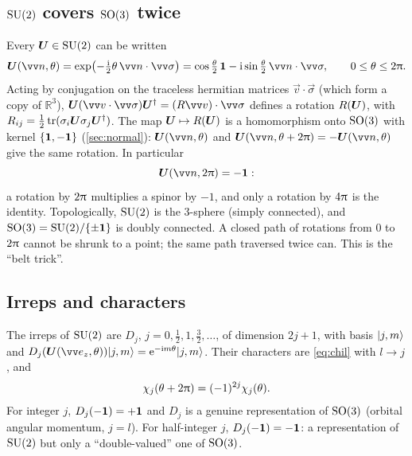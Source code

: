 \subsection{\texorpdfstring{$\mathrm{SU}(2)$}{SU(2)} covers \texorpdfstring{$\mathrm{SO}(3)$}{SO(3)} twice}
Every $\bm{U}\in\mathrm{SU}(2)$ can be written
\begin{equation}
\mat{U}(\vec{n},\theta)=\exp\bigl(-\tfrac{\ii}{2}\theta\,\vec{n}\cdot\vec{\sigma}\bigr)
=\cos\tfrac{\theta}{2}\,\one-\ii\sin\tfrac{\theta}{2}\,\vec{n}\cdot\vec{\sigma},
\qquad 0\le\theta\le2\cpi .
\end{equation}
Acting by conjugation on the traceless hermitian matrices $\vec{v}\cdot\vec{\sigma}$
(which form a copy of $\mathbb{R}^3$), $\mat{U}(\vec{v}\cdot\vec{\sigma})\mat{U}\herm=
(R\vec{v})\cdot\vec{\sigma}$ defines a rotation $R(\bm{U})$, with
$R_{ij}=\tfrac12\operatorname{tr}(\sigma_i\bm{U}\sigma_j\bm{U}^{\dagger})$. The map $\bm{U}\mapsto R(\bm{U})$ is a
homomorphism onto $\mathrm{SO}(3)$ with kernel $\{\bm{1},-\bm{1}\}$ (\cref{sec:normal}):
$\mat{U}(\vec{n},\theta)$ and $\mat{U}(\vec{n},\theta+2\cpi)=-\mat{U}(\vec{n},\theta)$ give
the same rotation. In particular
\begin{equation}
\mat{U}(\vec{n},2\cpi)=-\one:
\end{equation}
a rotation by $2\uppi$ multiplies a spinor by $-1$, and only a rotation by $4\uppi$ is the
identity. Topologically, $\mathrm{SU}(2)$ is the 3-sphere (simply connected), and
$\mathrm{SO}(3)=\mathrm{SU}(2)/\{\pm\bm{1}\}$ is doubly connected. A closed path of rotations from $0$ to
$2\uppi$ cannot be shrunk to a point; the same path traversed twice can. This is the
``belt trick''.

\subsection{Irreps and characters}
The irreps of $\mathrm{SU}(2)$ are $D_j$, $j=0,\tfrac12,1,\tfrac32,\dots$, of dimension $2j+1$,
with basis $\lvert j,m\rangle$ and $D_j(\mat{U}(\vec{e}_z,\theta))\ket{j,m}=\ee^{-\ii m\theta}\ket{j,m}$.
Their characters are \eqref{eq:chil} with $l\to j$, and
\begin{equation}
\chi_j(\theta+2\uppi)=(-1)^{2j}\chi_j(\theta).
\end{equation}
For integer $j$, $D_j(-\bm{1})=+\bm{1}$ and $D_j$ is a genuine representation of $\mathrm{SO}(3)$
(orbital angular momentum, $j=l$). For half-integer $j$, $D_j(-\bm{1})=-\bm{1}$: a
representation of $\mathrm{SU}(2)$ but only a ``double-valued'' one of $\mathrm{SO}(3)$.

